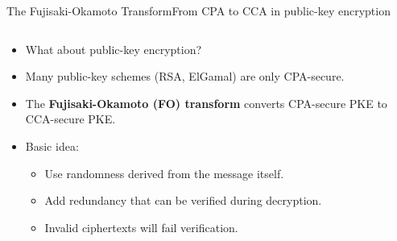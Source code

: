 \documentclass[aspectratio=169, lualatex, handout]{beamer}
\begin{document}
\begin{frame}{The Fujisaki-Okamoto Transform}{From CPA to CCA in public-key encryption}
	\begin{columns}[c]
		\begin{column}{0.6\textwidth}
			\begin{itemize}
				\item What about public-key encryption?
				\item Many public-key schemes (RSA, ElGamal) are only CPA-secure.
				\item The \textbf{Fujisaki-Okamoto (FO) transform} converts CPA-secure PKE to CCA-secure PKE.
				\item Basic idea:
				      \begin{itemize}
					      \item Use randomness derived from the message itself.
					      \item Add redundancy that can be verified during decryption.
					      \item Invalid ciphertexts will fail verification.
				      \end{itemize}
			\end{itemize}
		\end{column}
		\begin{column}{0.4\textwidth}
		\end{column}
	\end{columns}
\end{frame}

\begin{frame}[plain]
	\titlepage
\end{frame}
\end{document}
